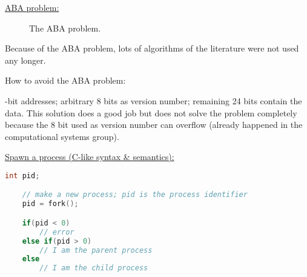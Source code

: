 \par{
	\noindent\underline{ABA problem:}
	\begin{figure}[H]
		\centering
		\caption{The ABA problem.}
		\label{fig:abaproblem}
	\end{figure}
	\par{
		\noindent
		Because of the ABA problem, lots of algorithms of the literature were not used any longer.
	}
	\par{
		\noindent
		How to avoid the ABA problem:
		\par{
			-bit addresses; arbitrary 8 bits as version number; remaining 24 bits contain the data. \newline
			This solution does a good job but does not solve the problem completely because the 8 bit used as version number can overflow (already happened in the computational systems group).
		}
	}
}
\par{
	\noindent\underline{Spawn a process (C-like syntax \& semantics):}
	\begin{lstlisting}[language = C, frame = none]
	int pid;

	// make a new process; pid is the process identifier
	pid = fork();

	if(pid < 0)
		// error
	else if(pid > 0)
		// I am the parent process
	else
		// I am the child process
	\end{lstlisting}
}
